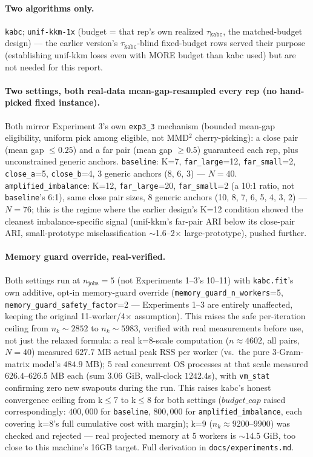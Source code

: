 \documentclass[11pt]{article}
\begin{document}
\paragraph{Two algorithms only.} \texttt{kabc}; \texttt{unif-kkm-1x}
(budget = that rep's own realized $\tau_{\texttt{kabc}}$, the matched-budget
design) --- the earlier version's $\tau_{\texttt{kabc}}$-blind fixed-budget
rows served their purpose (establishing unif-kkm loses even with MORE
budget than kabc used) but are not needed for this report.

\paragraph{Two settings, both real-data mean-gap-resampled every rep (no
hand-picked fixed instance).} Both mirror Experiment 3's own
\texttt{exp3\_3} mechanism (bounded mean-gap eligibility, uniform pick among
eligible, not MMD$^2$ cherry-picking): a close pair (mean gap $\le 0.25$)
and a far pair (mean gap $\ge 0.5$) guaranteed each rep, plus unconstrained
generic anchors. \texttt{baseline}: K=7, \texttt{far\_large}{=}12,
\texttt{far\_small}{=}2, \texttt{close\_a}{=}5, \texttt{close\_b}{=}4, 3
generic anchors (8, 6, 3) --- $N{=}40$. \texttt{amplified\_imbalance}: K=12,
\texttt{far\_large}{=}20, \texttt{far\_small}{=}2 (a 10:1 ratio, not
\texttt{baseline}'s 6:1), same close pair sizes, 8 generic anchors (10, 8,
7, 6, 5, 4, 3, 2) --- $N{=}76$; this is the regime where the earlier
design's K=12 condition showed the cleanest imbalance-specific signal
(unif-kkm's far-pair ARI below its close-pair ARI, small-prototype
misclassification $\sim$1.6--2$\times$ large-prototype), pushed further.

\paragraph{Memory guard override, real-verified.} Both settings run at
$n_{\text{jobs}}{=}5$ (not Experiments 1--3's 10--11) with
\texttt{kabc.fit}'s own additive, opt-in memory-guard override
(\texttt{memory\_guard\_n\_workers}{=}5,
\texttt{memory\_guard\_safety\_factor}{=}2 --- Experiments 1--3 are
entirely unaffected, keeping the original 11-worker/4$\times$ assumption).
This raises the safe per-iteration ceiling from $n_k{\sim}2852$ to
$n_k{\sim}5983$, verified with real measurements before use, not just the
relaxed formula: a real k=8-scale computation ($n{\approx}4602$, all pairs,
$N{=}40$) measured $627.7$ MB actual peak RSS per worker (vs.\ the pure
3-Gram-matrix model's $484.9$ MB); 5 real concurrent OS processes at that
scale measured $626.4$--$626.5$ MB each (sum $3.06$ GiB, wall-clock
$1242.4$s), with \texttt{vm\_stat} confirming zero new swapouts during the
run. This raises kabc's honest convergence ceiling from k$\le$7 to k$\le$8
for both settings ($budget\_cap$ raised correspondingly: $400{,}000$ for
\texttt{baseline}, $800{,}000$ for \texttt{amplified\_imbalance}, each
covering k=8's full cumulative cost with margin); k=9
($n_k{\approx}9200$--$9900$) was checked and rejected --- real projected
memory at 5 workers is $\sim$14.5 GiB, too close to this machine's 16GB
target. Full derivation in \texttt{docs/experiments.md}.
\end{document}
